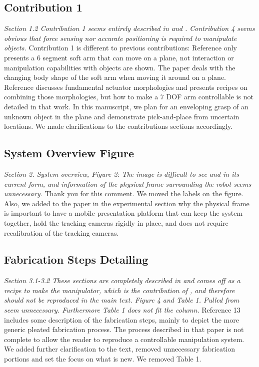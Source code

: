 \documentclass[letterpaper, 10 pt, twocolumn, conference]{article}
\begin{document}
\subsection{Contribution 1}
\textit{Section 1.2 Contribution 1 seems entirely described in \cite{marchese2014whole} and \cite{marchese2015recipe}. Contribution 4 seems obvious that force sensing nor accurate positioning is required to manipulate objects.}
%
Contribution 1 is different to previous contributions: Reference \cite{marchese2014whole} only presents a 6 segment soft arm that can move on a plane, not interaction or manipulation capabilities with objects are shown. The paper deals with the changing body shape of the soft arm when moving it around on a plane. Reference \cite{marchese2015recipe} discusses fundamental actuator morphologies and presents recipes on combining those morphologies, but how to make a 7 DOF arm controllable is not detailed in that work. In this manuscript, we plan for an enveloping grasp of an unknown object in the plane and demonstrate pick-and-place from uncertain locations. We made clarifications to the contributions sections accordingly.
%
\subsection{System Overview Figure}
\textit{Section 2. System overview, Figure 2: The image is difficult to see and in its current form, and information of the physical frame surrounding the robot seems unnecessary.}
%
Thank you for this comment. We moved the labels on the figure. Also, we added to the paper in the experimental section why the physical frame is important to have a mobile presentation platform that can keep the system together, hold the tracking cameras rigidly in place, and does not require recalibration of the tracking cameras. 
%
\subsection{Fabrication Steps Detailing}
\textit{Section 3.1-3.2 These sections are completely described in \cite{marchese2015recipe}  and comes off as a recipe to make the manipulator, which is the contribution of \cite{marchese2015recipe}, and therefore should not be reproduced in the main text. Figure 4 and Table 1. Pulled from \cite{marchese2015recipe} seem unnecessary. Furthermore Table 1 does not fit the column.}
%
Reference 13 includes some description of the fabrication steps, mainly to depict the more generic pleated fabrication process.  The process described in that paper is not complete to allow the reader to reproduce a controllable manipulation system. We added further clarification to the text, removed unnecessary fabrication portions and set the focus on what is new. We removed Table 1.
%
\end{document}
